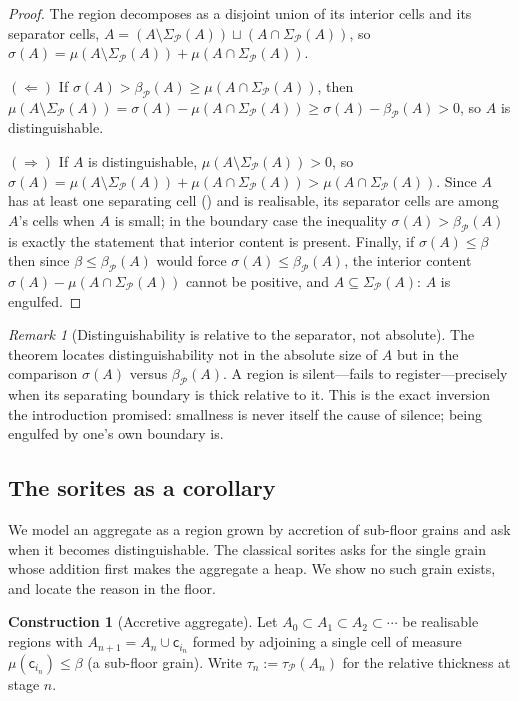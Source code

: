 \documentclass[11pt,a4paper]{article}
\theoremstyle{thmstyle}
\theoremstyle{definition}
\newtheorem{construction}[theorem]{Construction}
\theoremstyle{remark}
\newtheorem{remark}[theorem]{Remark}
\newcommand{\thick}{\beta}
\newcommand{\Part}{\mathscr{P}}
\newcommand{\cell}{\mathsf{c}}
\begin{document}
\begin{proof}
The region decomposes as a disjoint union of its interior cells and its
separator cells, $A=(A\setminus\Sigma_\Part(A))\sqcup(A\cap\Sigma_\Part(A))$, so
$\sigma(A)=\mu(A\setminus\Sigma_\Part(A))+\mu(A\cap\Sigma_\Part(A))$.

$(\Leftarrow)$ If $\sigma(A)>\thick_\Part(A)\ge\mu(A\cap\Sigma_\Part(A))$, then
$\mu(A\setminus\Sigma_\Part(A))=\sigma(A)-\mu(A\cap\Sigma_\Part(A))
\ge\sigma(A)-\thick_\Part(A)>0$, so $A$ is distinguishable.

$(\Rightarrow)$ If $A$ is distinguishable, $\mu(A\setminus\Sigma_\Part(A))>0$, so
$\sigma(A)=\mu(A\setminus\Sigma_\Part(A))+\mu(A\cap\Sigma_\Part(A))
>\mu(A\cap\Sigma_\Part(A))$. Since $A$ has at least one separating cell
() and is realisable, its separator cells are among $A$'s
cells when $A$ is small; in the boundary case the inequality
$\sigma(A)>\thick_\Part(A)$ is exactly the statement that interior content is
present. Finally, if $\sigma(A)\le\thick$ then since
$\thick\le\thick_\Part(A)$ would force $\sigma(A)\le\thick_\Part(A)$, the
interior content $\sigma(A)-\mu(A\cap\Sigma_\Part(A))$ cannot be positive, and
$A\subseteq\Sigma_\Part(A)$: $A$ is engulfed.
\end{proof}

\begin{remark}[Distinguishability is relative to the separator, not absolute]
\label{rem:relative}
The theorem locates distinguishability not in the absolute size of $A$ but in the
comparison $\sigma(A)$ versus $\thick_\Part(A)$. A region is silent---fails to
register---precisely when its separating boundary is thick relative to it. This
is the exact inversion the introduction promised: smallness is never itself the
cause of silence; being engulfed by one's own boundary is.
\end{remark}

\subsection{The sorites as a corollary}

We model an aggregate as a region grown by accretion of sub-floor grains and ask
when it becomes distinguishable. The classical sorites asks for the single grain
whose addition first makes the aggregate a heap. We show no such grain exists,
and locate the reason in the floor.

\begin{construction}[Accretive aggregate]
\label{con:accretion}
Let $A_0\subset A_1\subset A_2\subset\cdots$ be realisable regions with
$A_{n+1}=A_n\cup\cell_{i_n}$ formed by adjoining a single cell of measure
$\mu(\cell_{i_n})\le\thick$ \textup{(}a sub-floor grain\textup{)}. Write
$\tau_n:=\tau_\Part(A_n)$ for the relative thickness at stage $n$.
\end{construction}
\end{document}

